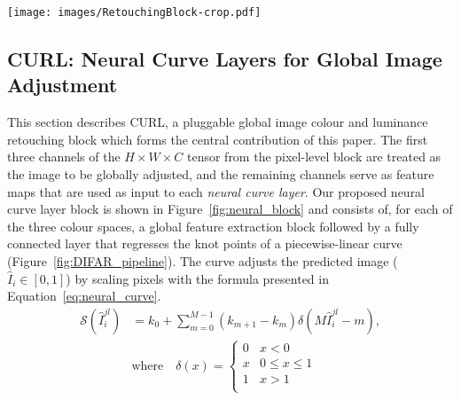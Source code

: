 \documentclass[a4paper,conference]{IEEEtran}
\begin{document}
\begin{figure*}[t!]
\begin{center}
\texttt{[image: images/RetouchingBlock-crop.pdf]}
\end{center}
\caption{\textbf{CURL block} refines the image from the backbone network to adjust luminance, colour and saturation. The image has luminance adjusted first, color (RGB) second, and saturation third using three piecewise linear curves. The output of this block is the final RGB image. $C$ is number of feature maps, $s$ stride, $d$ dilation rate, $H$ image height, $W$ image width.}
\label{fig:neural_block}
\end{figure*}


\subsection{CURL: Neural Curve Layers for Global Image Adjustment}\label{sec:highlevel}

This section describes CURL, a pluggable global image colour and luminance retouching block which forms the central contribution of this paper. The first three channels of the $H{\times}W{\times}C$ tensor from the pixel-level block are treated as the image to be globally adjusted, and the remaining channels serve as feature maps that are used as input to each \emph{neural curve layer}. Our proposed neural curve layer block is shown in Figure~\ref{fig:neural_block} and consists of, for each of the three colour spaces, a global feature extraction block followed by a fully connected layer that regresses the knot points of a piecewise-linear curve (Figure~\ref{fig:DIFAR_pipeline}). The curve adjusts the predicted image ($\hat{I}_{i}\in[0,1]$) by scaling pixels with the formula presented in Equation~\ref{eq:neural_curve}.
\begin{align}
\mathcal{S}(\hat{I}^{jl}_{i}) &= k_{0} + \sum^{M-1}_{m=0}(k_{m+1}-k_{m})\delta(M\hat{I}^{jl}_{i}-m) \label{eq:neural_curve}, \\      &\text{where}\hspace{1em} 
      \delta(x){=}\begin{cases} \nonumber 
      0 & x < 0 \\
      x & 0\leq x\leq 1 \\
      1 & x > 1 \\
        \end{cases}
\end{align}
\end{document}
